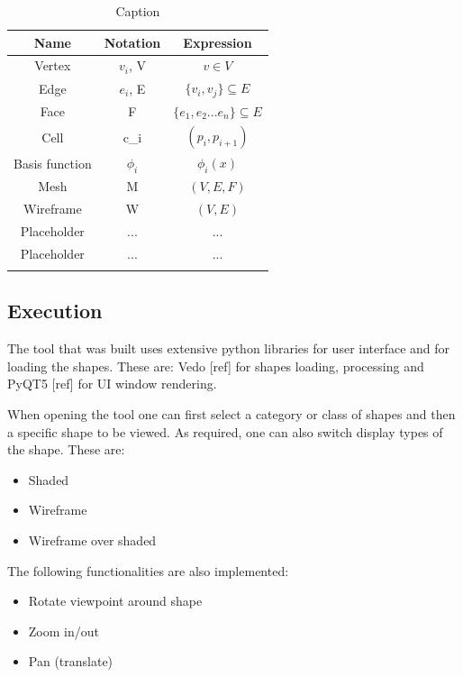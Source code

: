 \documentclass{article}
\begin{document}
\begin{center}
\begin{table}[h]
    \centering
    \begin{tabular}{c|c|c}
    \hline
         \textbf{Name} & \textbf{Notation} & \textbf{Expression} \\
         \hline
         Vertex & $v_i$, V & $v \in V$ \\
         \hline
         Edge & $e_i$, E & $\{v_i, v_j\} \subseteq E$ \\
         \hline
         Face & F & $\{e_1, e_2...e_n\} \subseteq E $ \\  
         \hline
         Cell & c_i & $(p_i, p_{i+1})$ \\
         \hline
         Basis function & $\phi_i$ & $\phi_i(x)$ \\
         \hline
         Mesh & M & $(V, E, F)$ \\
         \hline
         Wireframe & W & $(V, E)$ \\
         Placeholder & ... & ... \\
         \hline
         Placeholder & ... & ... \\
         & 
    \end{tabular}
    \caption{Caption}
    \label{tab:my_label}

\end{table}
\end{center}

\newpage
\subsection{Execution}
The tool that was built uses extensive python libraries for user interface and for loading the shapes. These are: Vedo [ref] for shapes loading, processing and PyQT5 [ref] for UI window rendering.

When opening the tool one can first select a category or class of shapes and then a specific shape to be viewed. As required, one can also switch display types of the shape. These are:
\begin{itemize}
    \item Shaded
    \item Wireframe
    \item Wireframe over shaded
\end{itemize}
The following functionalities are also implemented:
\begin{itemize}
    \item Rotate viewpoint around shape
    \item Zoom in/out
    \item Pan (translate)
\end{itemize}
\end{document}
